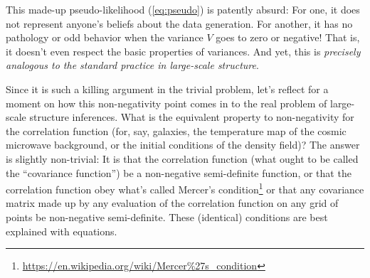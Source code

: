 \documentclass[12pt, letterpaper, preprint]{aastex}
\begin{document}
This made-up pseudo-likelihood (\ref{eq:pseudo}) is patently absurd:
For one, it does not represent anyone's beliefs about the data generation.
For another, it has no pathology or odd behavior when the variance $V$
goes to zero or negative!
That is, it doesn't even respect the basic properties of variances.
And yet, this is \emph{precisely analogous to the standard practice in
  large-scale structure}.

Since it is such a killing argument in the trivial problem, let's
reflect for a moment on how this non-negativity point comes in to the
real problem of large-scale structure inferences.
What is the equivalent property to non-negativity for the correlation
function (for, say, galaxies, the temperature map of the cosmic
microwave background, or the initial conditions of the density field)?
The answer is slightly non-trivial:
It is that the correlation function (what ought to be called the
``covariance function'') be a non-negative semi-definite function, or
that the correlation function obey what's called Mercer's condition\footnote{\url{https://en.wikipedia.org/wiki/Mercer\%27s_condition}}
or that any covariance matrix made up by any evaluation of the
correlation function on any grid of points be non-negative
semi-definite.
These (identical) conditions are best explained with equations.
\end{document}
